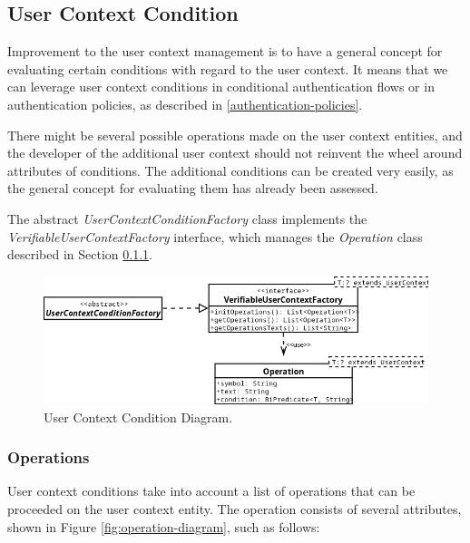 \newpage

\subsection{User Context Condition}
Improvement to the user context management is to have a general concept for evaluating certain conditions with regard to the user context.
It means that we can leverage user context conditions in conditional authentication flows or in authentication policies, as described in \ref{authentication-policies}.

There might be several possible operations made on the user context entities, and the developer of the additional user context should not reinvent the wheel around attributes of conditions.
The additional conditions can be created very easily, as the general concept for evaluating them has already been assessed.

The abstract \textit{UserContextConditionFactory} class implements the \textit{VerifiableUserContextFactory} interface, which manages the \textit{Operation} class described in Section \ref{user-context-condition-operations}.

\begin{figure}[htbp]
  \centering
  \includegraphics[width=1\textwidth]{img/sections/5-design/UserContextCondition.png}
  \caption{User Context Condition Diagram.}
  \label{fig:user-context-condition}
\end{figure}

\newpage

\subsubsection{Operations} \label{user-context-condition-operations}
User context conditions take into account a list of operations that can be proceeded on the user context entity.
The operation consists of several attributes, shown in Figure \ref{fig:operation-diagram}, such as follows:


